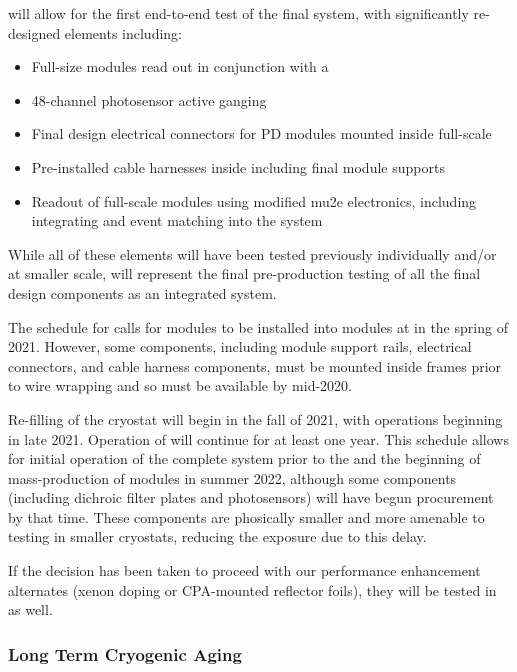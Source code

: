  will allow for the first end-to-end test of the final  system, with significantly re-designed elements including:
\begin{itemize}
    \item Full-size  modules read out in conjunction with a 
    \item \num{48}-channel photosensor active ganging
    \item Final design electrical connectors for PD modules mounted inside full-scale 
    \item Pre-installed cable harnesses inside  including final module supports
    \item Readout of full-scale  modules using modified mu2e electronics, including integrating  and  event matching into the  system
\end{itemize}

While all of these elements will have been tested previously individually and/or at smaller scale,  will represent the final pre-production testing of all the final design components as an integrated system.

The schedule for  calls for  modules to be installed into  modules at  in the spring of 2021. However, some components, including module support rails, electrical connectors, and cable harness components, must be mounted inside  frames prior to wire wrapping and so must be available by mid-2020.

Re-filling of the  cryostat will begin in the fall of 2021, with operations beginning in late 2021.  Operation of  will continue for at least one year.  This schedule allows for initial operation of the complete system prior to the   and the beginning of mass-production of  modules in summer 2022, although some components (including dichroic filter plates and photosensors) will have begun procurement by that time.  These components are phosically smaller and more amenable to testing in smaller cryostats, reducing the exposure due to this delay.

If the decision has been taken to proceed with our performance enhancement alternates (xenon doping or CPA-mounted reflector foils), they will be tested in  as well.

\subsubsection{Long Term Cryogenic Aging}
\label{sec:valid-longtermaging}

